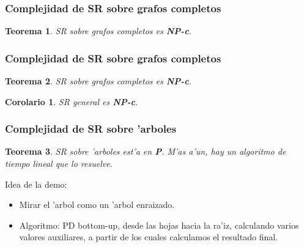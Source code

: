 \documentclass{beamer}
\newcommand{\class}[1]{\textnormal{\textbf{#1}}}
\newcommand{\probl}[1]{\textnormal{\textsf{#1}}}
\newtheorem*{thm}{Teorema}
\newtheorem{cor}{Corolario}
\begin{document}
\begin{frame}
\frametitle{Complejidad de \probl{SR} sobre grafos completos}

\begin{thm}
\probl{SR} sobre grafos completos es \class{NP-c}.
\end{thm}

\begin{figure}
	\begin{center}
		
	\end{center}	
\end{figure}

\end{frame}

\begin{frame}
\frametitle{Complejidad de \probl{SR} sobre grafos completos}

\begin{thm}
\probl{SR} sobre grafos completos es \class{NP-c}.
\end{thm}

\begin{figure}
	\begin{center}
		
	\end{center}	
\end{figure}

\pause

\begin{cor}
\probl{SR} general es \class{NP-c}.
\end{cor}

\end{frame}

\begin{frame}
\frametitle{Complejidad de \probl{SR} sobre 'arboles}

\pause

\begin{thm}
\probl{SR} sobre 'arboles est'a en \class{P}. M'as a'un, hay un algoritmo de tiempo lineal que lo resuelve.
\end{thm}

\pause
\vspace{3mm}

Idea de la demo:
\pause
\begin{itemize}
	\item Mirar el 'arbol como un 'arbol enraizado.
	\pause
	\item Algoritmo: PD bottom-up, desde las hojas hacia la ra'iz, calculando varios valores auxiliares, a partir de los cuales calculamos el resultado final.
\end{itemize}
\end{frame}
\end{document}
